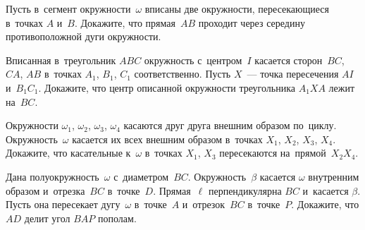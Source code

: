 


\begin{problems}



\item
Пусть в~сегмент окружности~$\omega$ вписаны две окружности, пересекающиеся
в~точках $A$ и~$B$.
Докажите, что прямая~$AB$ проходит через середину противоположной дуги
окружности.

\item
Вписанная в~треугольник $ABC$ окружность с~центром~$I$ касается сторон~$BC$,
$CA$, $AB$ в~точках $A_1$, $B_1$, $C_1$ соответственно.
Пусть $X$~--- точка пересечения $AI$ и~$B_{1}C_{1}$.
Докажите, что центр описанной окружности треугольника $A_{1}XA$ лежит на~$BC$.

\item
Окружности $\omega_1$, $\omega_2$, $\omega_3$, $\omega_4$ касаются друг друга
внешним образом по~циклу.
Окружность~$\omega$ касается их всех внешним образом в~точках
$X_1$, $X_2$, $X_3$, $X_4$.
Докажите, что касательные к~$\omega$ в~точках $X_1$, $X_3$ пересекаются
на~прямой~$X_{2}X_{4}$.

\item
Дана полуокружность~$\omega$ с~диаметром~$BC$.
Окружность~$\beta$ касается $\omega$ внутренним образом и~отрезка~$BC$
в~точке~$D$.
Прямая~$\ell$ перпендикулярна $BC$ и~касается $\beta$.
Пусть она пересекает дугу~$\omega$ в~точке~$A$ и~отрезок~$BC$ в~точке~$P$.
Докажите, что $AD$ делит угол $BAP$ пополам.



\end{problems}
